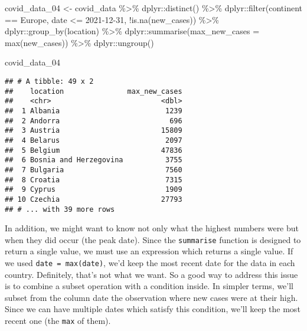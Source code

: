\documentclass[
]{book}
\newenvironment{Shaded}{\begin{snugshade}}{\end{snugshade}}
\newcommand{\AttributeTok}[1]{\textcolor[rgb]{0.77,0.63,0.00}{#1}}
\newcommand{\FunctionTok}[1]{\textcolor[rgb]{0.00,0.00,0.00}{#1}}
\newcommand{\NormalTok}[1]{#1}
\newcommand{\OtherTok}[1]{\textcolor[rgb]{0.56,0.35,0.01}{#1}}
\newcommand{\SpecialCharTok}[1]{\textcolor[rgb]{0.00,0.00,0.00}{#1}}
\newcommand{\StringTok}[1]{\textcolor[rgb]{0.31,0.60,0.02}{#1}}
\begin{document}
\begin{Shaded}
\begin{Highlighting}[]
\NormalTok{covid\_data\_04 }\OtherTok{\textless{}{-}}\NormalTok{ covid\_data }\SpecialCharTok{\%\textgreater{}\%} 
\NormalTok{  dplyr}\SpecialCharTok{::}\FunctionTok{distinct}\NormalTok{() }\SpecialCharTok{\%\textgreater{}\%} 
\NormalTok{  dplyr}\SpecialCharTok{::}\FunctionTok{filter}\NormalTok{(continent }\SpecialCharTok{==} \StringTok{\textquotesingle{}Europe\textquotesingle{}}\NormalTok{,}
\NormalTok{                date }\SpecialCharTok{\textless{}=} \StringTok{\textquotesingle{}2021{-}12{-}31\textquotesingle{}}\NormalTok{,}
                \SpecialCharTok{!}\FunctionTok{is.na}\NormalTok{(new\_cases)) }\SpecialCharTok{\%\textgreater{}\%} 
\NormalTok{  dplyr}\SpecialCharTok{::}\FunctionTok{group\_by}\NormalTok{(location) }\SpecialCharTok{\%\textgreater{}\%} 
\NormalTok{  dplyr}\SpecialCharTok{::}\FunctionTok{summarise}\NormalTok{(}\AttributeTok{max\_new\_cases =} \FunctionTok{max}\NormalTok{(new\_cases)) }\SpecialCharTok{\%\textgreater{}\%} 
\NormalTok{  dplyr}\SpecialCharTok{::}\FunctionTok{ungroup}\NormalTok{()}
   
\NormalTok{covid\_data\_04     }
\end{Highlighting}
\end{Shaded}

\begin{verbatim}
## # A tibble: 49 x 2
##    location               max_new_cases
##    <chr>                          <dbl>
##  1 Albania                         1239
##  2 Andorra                          696
##  3 Austria                        15809
##  4 Belarus                         2097
##  5 Belgium                        47836
##  6 Bosnia and Herzegovina          3755
##  7 Bulgaria                        7560
##  8 Croatia                         7315
##  9 Cyprus                          1909
## 10 Czechia                        27793
## # ... with 39 more rows
\end{verbatim}

In addition, we might want to know not only what the highest numbers were but when they did occur (the peak date). Since the \texttt{summarise} function is designed to return a single value, we must use an expression which returns a single value. If we used \texttt{date\ =\ max(date)}, we'd keep the most recent date for the data in each country. Definitely, that's not what we want. So a good way to address this issue is to combine a subset operation with a condition inside. In simpler terms, we'll subset from the column date the observation where new cases were at their high. Since we can have multiple dates which satisfy this condition, we'll keep the most recent one (the \texttt{max} of them).
\end{document}
